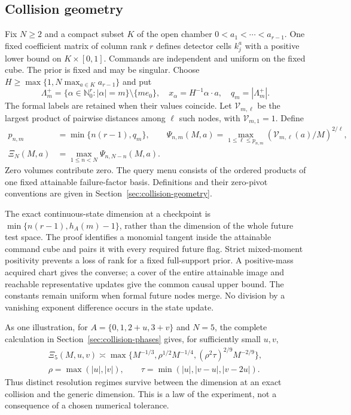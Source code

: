 \subsection{Collision geometry}
Fix $N\ge2$ and a compact subset $K$ of the open chamber
$0<a_1<\cdots<a_{r-1}$. One fixed coefficient matrix of column rank
$r$ defines detector cells $k_j^a$ with a positive lower bound on
$K\times[0,1]$. Commands are independent and uniform on the fixed
cube. The prior is fixed and may be singular. Choose
$H\ge\max\{1,N\max_{a\in K}a_{r-1}\}$ and put
\[
 \Lambda_m^+=\{\alpha\in\mathbb N_0^r:|\alpha|=m\}\setminus\{me_0\},
 \quad x_\alpha=H^{-1}\alpha\cdot a,\quad q_m=|\Lambda_m^+|.
\]
The formal labels are retained when their values coincide. Let
$\mathcal V_{m,\ell}$ be the largest product of pairwise distances
among $\ell$ such nodes, with $\mathcal V_{m,1}=1$. Define
\[
 \begin{split}
 p_{n,m}&=\min\{n(r-1),q_m\},\qquad
 \Psi_{n,m}(M,a)=\max_{1\le\ell\le p_{n,m}}
                  (\mathcal V_{m,\ell}(a)/M)^{2/\ell},\\
 \Xi_N(M,a)&=\max_{1\le n<N}\Psi_{n,N-n}(M,a).
 \end{split}
\]
Zero volumes contribute zero. The query menu consists of the ordered
products of one fixed attainable failure-factor basis. Definitions
and their zero-pivot conventions are given in
Section~\ref{sec:collision-geometry}.



The exact continuous-state dimension at a checkpoint is
$\min\{n(r-1),h_A(m)-1\}$, rather than the dimension of the whole
future test space. The proof identifies a monomial tangent inside the
attainable command cube and pairs it with every required future flag.
Strict mixed-moment positivity prevents a loss of rank for a fixed
full-support prior. A positive-mass acquired chart gives the converse;
a cover of the entire attainable image and reachable representative
updates give the common causal upper bound. The constants remain
uniform when formal future nodes merge. No division by a vanishing
exponent difference occurs in the state update.

As one illustration, for
$A=\{0,1,2+u,3+v\}$ and $N=5$, the complete calculation in
Section~\ref{sec:collision-phases} gives, for sufficiently small $u,v$,
\[
 \begin{gathered}
 \Xi_5(M,u,v)\asymp\max\{M^{-1/3},\rho^{1/2}M^{-1/4},
                       (\rho^2\tau)^{2/9}M^{-2/9}\},\\
 \rho=\max(|u|,|v|),\qquad
 \tau=\min(|u|,|v-u|,|v-2u|).
 \end{gathered}
\]
Thus distinct resolution regimes survive between the dimension at an
exact collision and the generic dimension. This is a law of the
experiment, not a consequence of a chosen numerical tolerance.

